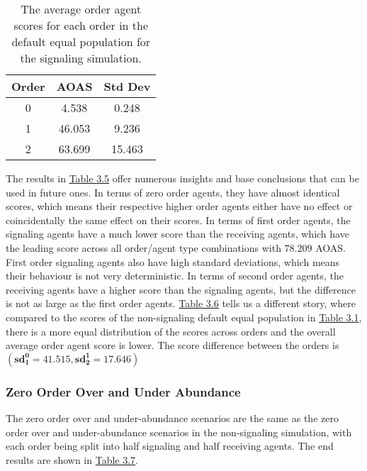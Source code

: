 \begin{table}[h]
    \centering
    \begin{tabular}{|c|c|c|}
    \hline
    Order & AOAS & Std Dev \\
    \hline
    0     & 4.538   & 0.248    \\
    1     & 46.053  & 9.236    \\
    2     & 63.699  & 15.463   \\
    \hline
    \end{tabular}
    \caption{The average order agent scores for each order in the default equal population for the signaling simulation.}
    \label{table:sig-default-equal-overall}
\end{table}

The results in \hyperref[table:sig-default-equal]{Table 3.5} offer numerous insights and base conclusions that can be used in future ones. In terms of zero order agents, they have almost identical scores, which means their respective higher order agents either have no effect or coincidentally the same effect on their scores. In terms of first order agents, the signaling agents have a much lower score than the receiving agents, which have the leading score across all order/agent type combinations with $78.209$ AOAS. First order signaling agents also have high standard deviations, which means their behaviour is not very deterministic. In terms of second order agents, the receiving agents have a higher score than the signaling agents, but the difference is not as large as the first order agents. \hyperref[table:sig-default-equal-overall]{Table 3.6} tells us a different story, where compared to the scores of the non-signaling default equal population in \hyperref[table:non-sig-default-equal-simple]{Table 3.1}, there is a more equal distribution of the scores across orders and the overall average order agent score is lower. The score difference between the orders is $(\mathbf{sd^0_1 = 41.515}, \mathbf{sd^1_2 = 17.646})$



\subsubsection{Zero Order Over and Under Abundance}

The zero order over and under-abundance scenarios are the same as the zero order over and under-abundance scenarios in the non-signaling simulation, with each order being split into half signaling and half receiving agents. The end results are shown in \hyperref[table:sig-zero-order-simple]{Table 3.7}.

